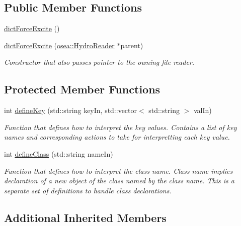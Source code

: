 \subsection*{Public Member Functions}
\begin{DoxyCompactItemize}
\item 
\hyperlink{classosea_1_1dict_force_excite_aae102c3eefc17f0d7d38aa7a34d07ac6}{dict\-Force\-Excite} ()
\item 
\hyperlink{classosea_1_1dict_force_excite_abadb6b1efc91320f165289db3659f6ef}{dict\-Force\-Excite} (\hyperlink{classosea_1_1_hydro_reader}{osea\-::\-Hydro\-Reader} $\ast$parent)
\begin{DoxyCompactList}\small\item\em Constructor that also passes pointer to the owning file reader. \end{DoxyCompactList}\end{DoxyCompactItemize}
\subsection*{Protected Member Functions}
\begin{DoxyCompactItemize}
\item 
int \hyperlink{classosea_1_1dict_force_excite_a271db50f8e1f80514d19d84ef66308ed}{define\-Key} (std\-::string key\-In, std\-::vector$<$ std\-::string $>$ val\-In)
\begin{DoxyCompactList}\small\item\em Function that defines how to interpret the key values. Contains a list of key names and corresponding actions to take for interpretting each key value. \end{DoxyCompactList}\item 
int \hyperlink{classosea_1_1dict_force_excite_a5f7b2b90224ccabef47c2c1598e238ca}{define\-Class} (std\-::string name\-In)
\begin{DoxyCompactList}\small\item\em Function that defines how to interpret the class name. Class name implies declaration of a new object of the class named by the class name. This is a separate set of definitions to handle class declarations. \end{DoxyCompactList}\end{DoxyCompactItemize}
\subsection*{Additional Inherited Members}


